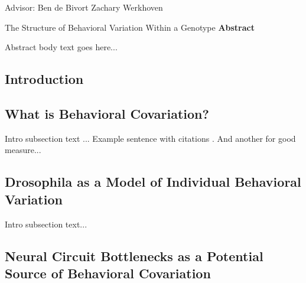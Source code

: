 \documentclass[12pt,letterpaper]{article}
\begin{document}
\noindent Advisor: Ben de Bivort \hfill Zachary Werkhoven
\newline
\vspace{-1.2cm}
\setcounter{page}{3}
\begin{center}\large The Structure of Behavioral Variation Within a Genotype \newline \small \textbf{Abstract}\end{center}
\newline

Abstract body text goes here...
\clearpage


\tableofcontents
\clearpage


\begin{center}
    \Large\section{Introduction}
    \thispagestyle{empty}       %
    \clearpage
\end{center}

\setcounter{page}{1}       
\subsection{What is Behavioral Covariation?}

Intro subsection text ... Example sentence with citations \cite{Goodman_IsoGrasshopers_1978,Chou_jcomp_2010}. And another for good measure... \cite{Linneweber_A_2019}

\subsection{Drosophila as a Model of Individual Behavioral Variation}

Intro subsection text...

\subsection{Neural Circuit Bottlenecks as a Potential Source of Behavioral Covariation}
\end{document}
